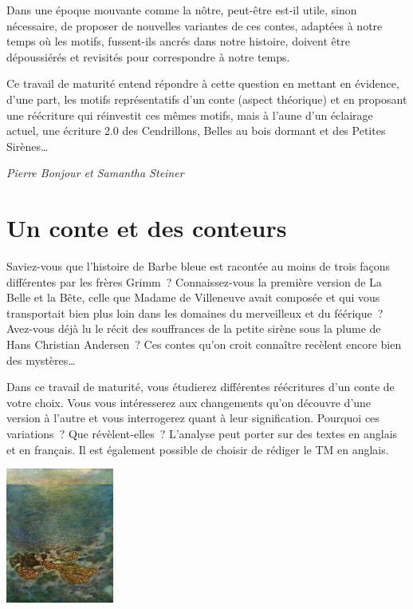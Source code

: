 \documentclass[
  10pt,
  french,
  a5paper,
  openany]{book}
\newenvironment{signature}{\begin{flushright}}{\end{flushright}}
\begin{document}
Dans une époque mouvante comme la nôtre, peut-être est-il utile, sinon nécessaire, de proposer de nouvelles variantes de ces contes, adaptées à notre temps où les motifs, fussent-ils ancrés dans notre histoire, doivent être dépoussiérés et revisités pour correspondre à notre temps.

Ce travail de maturité entend répondre à cette question en mettant en évidence, d'une part, les motifs représentatifs d'un conte (aspect théorique) et en proposant une réécriture qui réinvestit ces mêmes motifs, mais à l'aune d'un éclairage actuel, une écriture 2.0 des Cendrillons, Belles au bois dormant et des Petites Sirènes\ldots{}

\begin{signature}
\emph{Pierre Bonjour et Samantha Steiner}

\end{signature}

\hypertarget{un-conte-et-des-conteurs}{%
\chapter{Un conte et des conteurs}\label{un-conte-et-des-conteurs}}

Saviez-vous que l'histoire de Barbe bleue est racontée au moins de trois façons différentes par les frères Grimm~? Connaissez-vous la première version de La Belle et la Bête, celle que Madame de Villeneuve avait composée et qui vous transportait bien plus loin dans les domaines du merveilleux et du féérique~? Avez-vous déjà lu le récit des souffrances de la petite sirène sous la plume de Hans Christian Andersen~? Ces contes qu'on croit connaître recèlent encore bien des mystères\ldots{}

Dans ce travail de maturité, vous étudierez différentes réécritures d'un conte de votre choix. Vous vous intéresserez aux changements qu'on découvre d'une version à l'autre et vous interrogerez quant à leur signification. Pourquoi ces variations~? Que révèlent-elles~? L'analyse peut porter sur des textes en anglais et en français. Il est également possible de choisir de rédiger le TM en anglais.

\begin{center}
\includegraphics[width=\textwidth,height=12em]{images/un-conte-et-des-conteurs.jpg}

\end{center}
\end{document}
